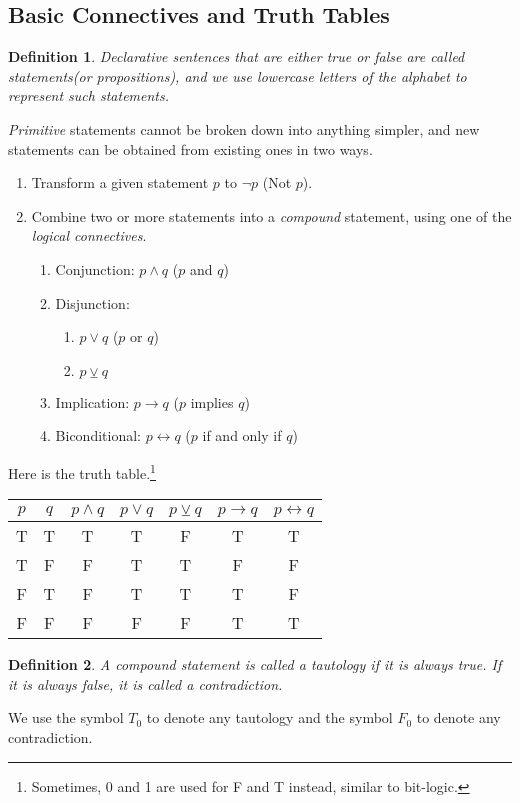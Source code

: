 \documentclass[12pt]{article}
\newtheorem{definition}{Definition} [section]
\begin{document}
\subsection{Basic Connectives and Truth Tables}
\begin{definition}{\emph{Declarative sentences that are either true or false are called} statements\emph{(or} propositions\emph{), and we use lowercase letters of the alphabet to represent such statements.}}
\end{definition}
\emph{Primitive} statements cannot be broken down into anything simpler, and new statements can be obtained from existing ones in two ways.
\begin{enumerate}
\item Transform a given statement $p$ to $\neg p$ (Not $p$).\\
\item Combine two or more statements into a \emph{compound} statement, using one of the \emph{logical connectives}.
\begin{enumerate}
\item Conjunction: $p \wedge q$ ($p$ and $q$)
\item Disjunction: 
\begin{enumerate}
\item$p \vee q$ ($p$ or $q$)
\item $p \veebar q$
\end{enumerate}
\item Implication: $p \rightarrow q$ ($p$ implies $q$)
\item Biconditional: $p \leftrightarrow q$ ($p$ if and only if $q$)
\end{enumerate}
\end{enumerate}
Here is the truth table.\footnote{Sometimes, 0 and 1 are used for F and T instead, similar to bit-logic.}
\begin{center}
\begin{tabular}{|c|c|c|c|c|c|c|}
\hline
$p$ & $q$ & $p \wedge q$ & $p \vee q$ & $p \veebar q$ & $p \rightarrow q$ & $p \leftrightarrow q$ \\
\hline
T & T & T & T & F & T & T \\
\hline
T & F & F & T & T & F & F \\
\hline
F & T & F & T & T & T & F \\
\hline
F & F & F & F & F & T & T \\
\hline
\end{tabular}
\end{center}
\begin{definition}
\emph{A compound statement is called a} tautology \emph{if it is always true. If it is always false, it is called a }contradiction. 
\end{definition}
We use the symbol $T_0$ to denote any tautology and the symbol $F_0$ to denote any contradiction.
\end{document}
